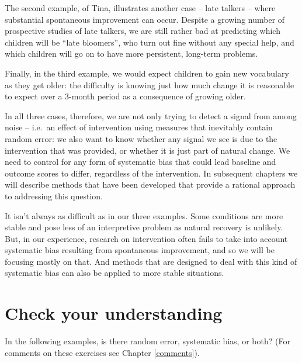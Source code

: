 \documentclass{krantz}
\begin{document}
The second example, of Tina, illustrates another case -- late talkers -- where substantial spontaneous improvement can occur. Despite a growing number of prospective studies of late talkers, we are still rather bad at predicting which children will be ``late bloomers'', who turn out fine without any special help, and which children will go on to have more persistent, long-term problems.

Finally, in the third example, we would expect children to gain new vocabulary as they get older: the difficulty is knowing just how much change it is reasonable to expect over a 3-month period as a consequence of growing older.

In all three cases, therefore, we are not only trying to detect a signal from among noise -- i.e.~an effect of intervention using measures that inevitably contain random error: we also want to know whether any signal we see is due to the intervention that was provided, or whether it is just part of natural change. We need to control for any form of systematic bias that could lead baseline and outcome scores to differ, regardless of the intervention. In subsequent chapters we will describe methods that have been developed that provide a rational approach to addressing this question.

It isn't always as difficult as in our three examples. Some conditions are more stable and pose less of an interpretive problem as natural recovery is unlikely. But, in our experience, research on intervention often fails to take into account systematic bias resulting from spontaneous improvement, and so we will be focusing mostly on that. And methods that are designed to deal with this kind of systematic bias can also be applied to more stable situations.

\hypertarget{check-your-understanding}{%
\section{Check your understanding}\label{check-your-understanding}}

In the following examples, is there random error, systematic bias, or both? (For comments on these exercises see Chapter \ref{comments}).
\end{document}
